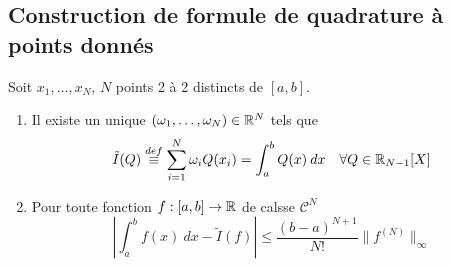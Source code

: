 \subsection{Construction de formule de quadrature à points donnés}
\begin{prop}
    Soit $x_1, \ldots, x_N$, $N$ points 2 à 2 distincts de  $[a, b]$. 
    \begin{enumerate}
        \item Il existe un unique $(\omega_1, \ldots, \omega_N) \in \mathbb{R}^N$ tels que 
            \[
                \tilde{I}(Q) \overset{def}{\equiv} \sum_{i=1}^{N} \omega_iQ(x_i) = \int_{{a}}^{{b}} {Q(x)} \: d{x} \quad \forall Q \in \mathbb{R}_{N-1}[X]
            \] 
        \item Pour toute fonction $f: [a, b] \to \mathbb{R}$ de calsse $\mathcal{C}^N$
             \[
                 \left| \int_{{a}}^{{b}} {f(x)} \: d{x} - \tilde{I}(f) \right| \le \frac{(b-a)^{N+1}}{N!}\|f^{(N)}\|_{\infty}
            \] 
    \end{enumerate}
\end{prop}
